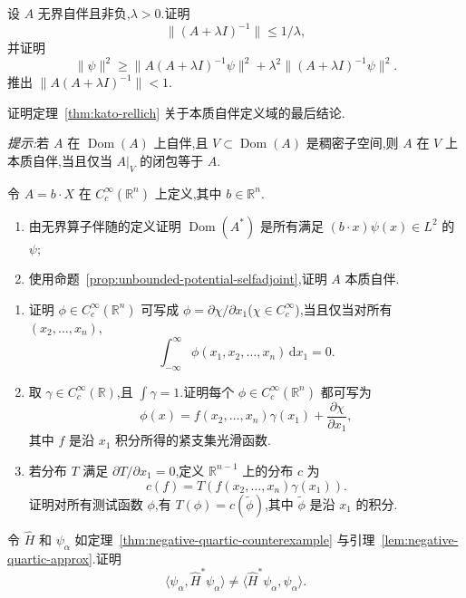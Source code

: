 \begin{exercise}[非负算子的正实预解估计]\label{ex:nonnegative-resolvent-estimates}
设 \(A\) 无界自伴且非负,\(\lambda>0\).证明
\[
\|(A+\lambda I)^{-1}\|\leq1/\lambda,
\]
并证明
\[
\|\psi\|^{2}\geq\|A(A+\lambda I)^{-1}\psi\|^{2}+\lambda^{2}\|(A+\lambda I)^{-1}\psi\|^{2}.
\]
推出 \(\|A(A+\lambda I)^{-1}\|<1\).
\end{exercise}

\begin{exercise}\label{ex:kato-rellich-essential-domain}
证明定理~\ref{thm:kato-rellich} 关于本质自伴定义域的最后结论.

\emph{提示:}若 \(A\) 在 \(\operatorname{Dom}(A)\) 上自伴,且 \(V\subset\operatorname{Dom}(A)\) 是稠密子空间,则 \(A\) 在 \(V\) 上本质自伴,当且仅当 \(A|_{V}\) 的闭包等于 \(A\).
\end{exercise}

\begin{exercise}[线性位置算子]\label{ex:linear-position-essential}
令 \(A=b\cdot X\) 在 \(C_{c}^{\infty}(\mathbb{R}^{n})\) 上定义,其中 \(b\in\mathbb{R}^{n}\).
\begin{enumerate}[label=(\alph*)]
\item 由无界算子伴随的定义证明 \(\operatorname{Dom}(A^{*})\) 是所有满足 \((b\cdot x)\psi(x)\in L^{2}\) 的 \(\psi\);
\item 使用命题~\ref{prop:unbounded-potential-selfadjoint},证明 \(A\) 本质自伴.
\end{enumerate}
\end{exercise}

\begin{exercise}[分布的零偏导数]\label{ex:distribution-zero-derivative}
\begin{enumerate}[label=(\alph*)]
\item 证明 \(\phi\in C_{c}^{\infty}(\mathbb{R}^{n})\) 可写成 \(\phi=\partial\chi/\partial x_{1}\)(\(\chi\in C_{c}^{\infty}\)),当且仅当对所有 \((x_{2},\ldots,x_{n})\),
\[
\int_{-\infty}^{\infty}\phi(x_{1},x_{2},\ldots,x_{n})\,\mathrm{d}x_{1}=0.
\]
\item 取 \(\gamma\in C_{c}^{\infty}(\mathbb{R})\),且 \(\int\gamma=1\).证明每个 \(\phi\in C_{c}^{\infty}(\mathbb{R}^{n})\) 都可写为
\[
\phi(x)=f(x_{2},\ldots,x_{n})\gamma(x_{1})+\frac{\partial\chi}{\partial x_{1}},
\]
其中 \(f\) 是沿 \(x_{1}\) 积分所得的紧支集光滑函数.
\item 若分布 \(T\) 满足 \(\partial T/\partial x_{1}=0\),定义 \(\mathbb{R}^{n-1}\) 上的分布 \(c\) 为
\[
c(f)=T(f(x_{2},\ldots,x_{n})\gamma(x_{1})).
\]
证明对所有测试函数 \(\phi\),有 \(T(\phi)=c(\widetilde\phi)\),其中 \(\widetilde\phi\) 是沿 \(x_{1}\) 的积分.
\end{enumerate}
\end{exercise}

\begin{exercise}[负四次势反例的直接验证]\label{ex:negative-quartic-direct}
令 \(\widehat H\) 和 \(\psi_{\alpha}\) 如定理~\ref{thm:negative-quartic-counterexample} 与引理~\ref{lem:negative-quartic-approx}.证明
\[
\langle\psi_{\alpha},\widehat H^{*}\psi_{\alpha}\rangle
\neq\langle\widehat H^{*}\psi_{\alpha},\psi_{\alpha}\rangle.
\]
\end{exercise}
